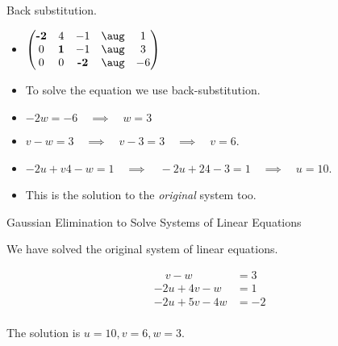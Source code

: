 \documentclass{beamer}
\begin{document}

\begin{frame}{Back substitution.}

\begin{itemize}
\item $
\begin{pmatrix}
\textbf{-2} &         4  &          -1  &  \aug & 1  \\
        0   & \textbf{1} &          -1  &  \aug & 3  \\
        0   &         0  & \textbf{-2}  &  \aug & -6  \\
\end{pmatrix}
$
\item To solve the equation we use back-substitution.
\item $-2 w = -6 \quad \implies \quad w = 3$
\item $v - w = 3 \quad \implies \quad v - 3 = 3 \quad \implies \quad v=6$.
\item $-2 u + v4 -w  = 1 \quad \implies \quad -2u +24 - 3 = 1 \quad \implies \quad u = 10$.
\item This is the solution to the \emph{original} system too.
\end{itemize}
\end{frame}


\begin{frame}{Gaussian Elimination to Solve Systems of Linear Equations}

We have solved the original system of linear equations.

\pause

\begin{align*}
 \quad v - w         &= 3 \\
-2u + 4v - w         &= 1 \\
-2u + 5v - 4w        &= -2 \\
\end{align*}

\pause

The solution is $u = 10, v=6, w=3$.

\end{frame}
\end{document}
